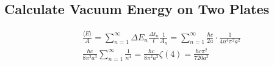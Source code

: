 \subsection*{Calculate Vacuum Energy on Two Plates}
\begin{align}
    &\frac{\langle E \rangle}{A} = \sum_{n=1}^{\infty}\Delta E_n\frac{\Delta t_n}{t}\frac{1}{A_n} = \sum_{n=1}^{\infty} \frac{\hbar c }{2 a} \cdot \frac{1}{4 n^4 \pi^2 a^2} \nonumber \\
    &\frac{\hbar c}{8 \pi^2 a^3} \sum_{n=1}^{\infty} \frac{1}{n^4} = \frac{\hbar c}{8 \pi^2 a^3} \zeta(4) = \frac{\hbar c \pi^2}{720 a^3}
\end{align}
